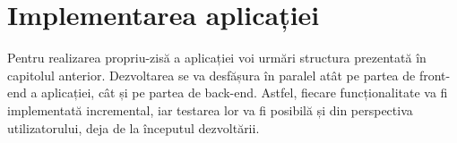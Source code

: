 \documentclass[12pt,a4paper]{report}
\theoremstyle{definition}
\theoremstyle{remark}
\begin{document}







\chapter{Implementarea aplicației}
\par Pentru realizarea propriu-zisă a aplicației voi urmări structura prezentată în capitolul anterior. Dezvoltarea se va desfășura în paralel atât pe partea de front-end a aplicației, cât și pe partea de back-end. Astfel, fiecare funcționalitate va fi implementată incremental, iar testarea lor va fi posibilă și din perspectiva utilizatorului, deja de la începutul dezvoltării.
\end{document}
